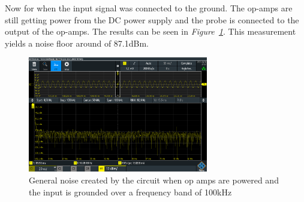 \clearpage



Now for when the input signal was connected to the ground.
The op-amps are still getting power from the DC power supply and the probe is connected to the output of the op-amps.
The results can be seen in \textit{Figure~\ref{fig:noisefloor100k}}.
This measurement yields a noise floor around of 87.1dBm.


\begin{figure}[h]
    \centering
    \includegraphics[width=0.7\textwidth]{graphics/NoiseFloor100k.PNG}
    \caption{General noise created by the circuit when op amps are powered and the input is grounded over a frequency band of 100kHz}
    \label{fig:noisefloor100k}
\end{figure}






\clearpage





